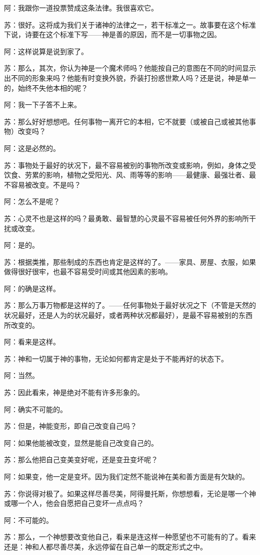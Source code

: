 \documentclass[12pt,oneside]{book}
\begin{document}
阿：我跟你一道投票赞成这条法律。我很喜欢它。

苏：很好。这将成为我们关于诸神的法律之一，若干标准之一。故事要在这个标准下说，诗要在这个标准下写——神是善的原因，而不是一切事物之因。

阿：这样说算是说到家了。

苏：那么，其次，你认为神是一个魔术师吗？他能按自己的意图在不同的时间显示出不同的形象来吗？他能有时变换外貌，乔装打扮惑世欺人吗？还是说，神是单一的，始终不失他本相的呢？

阿：我一下子答不上来。

苏：那么好好想想吧。任何事物一离开它的本相，它不就要（或被自己或被其他事物）改变吗？

阿：这是必然的。

苏：事物处于最好的状况下，最不容易被别的事物所改变或影响，例如，身体之受饮食、劳累的影响，植物之受阳光、风、雨等等的影响——最健康、最强壮者、最不容易被改变。不是吗？

阿：怎么不是呢？

苏：心灵不也是这样的吗？最勇敢、最智慧的心灵最不容易被任何外界的影响所干扰或改变。

阿：是的。

苏：根据类推，那些制成的东西也肯定是这样的了。——家具、房屋、衣服，如果做得很好很牢，也最不容易受时间或其他因素的影响。

阿：的确是这样。

苏：那么万事万物都是这样的了。——任何事物处于最好状况之下（不管是天然的状况最好，还是人为的状况最好，或者两种状况都最好），是最不容易被别的东西所改变的。

阿：看来是这样。

苏：神和一切属于神的事物，无论如何都肯定是处于不能再好的状态下。

阿：当然。

苏：因此看来，神是绝对不能有许多形象的。

阿：确实不可能的。

苏：但是，神能变形，即自己改变自己吗？

阿：如果他能被改变，显然是能自己改变自己的。

苏：那么他把自己变美变好呢，还是变丑变坏呢？

阿：如果变，他一定是变坏。因为我们定然不能说神在美和善方面是有欠缺的。

苏：你说得对极了。如果这样尽善尽美，阿得曼托斯，你想想看，无论是哪一个神或哪一个人，他会自愿把自己变坏一点点吗？

阿：不可能的。

苏：那么，一个神想要改变他自己，看来是连这样一种愿望也不可能有的了。看来还是：神和人都尽善尽美，永远停留在自己单一的既定形式之中。
\end{document}
